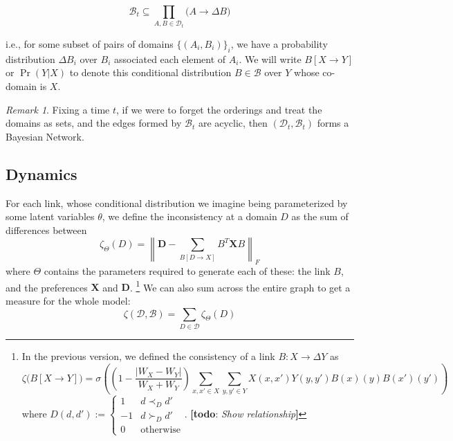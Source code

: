 \documentclass{article}
\theoremstyle{plain}
\theoremstyle{definition}
\theoremstyle{remark}
\newtheorem*{remark}{Remark}
\newcommand{\todo}[1]{{\color{red}\large\textbf{[todo}: {\normalsize\itshape#1}\textbf{]}}}
\newcommand\mat[1]{\mathbf #1}
\begin{document}
	\[  \mathcal B_t \subseteq \prod_{A, B \in \mathcal D_t} \Big( A \to \Delta B \Big) \] 
	
	i.e., for some subset of pairs of domains $\{ (A_i, B_i) \}_i$, we have a probability distribution $\Delta B_i$ over $B_i$ associated each element of $A_i$. We will write $B [X \to Y]$ or $\Pr(Y | X)$ to denote this conditional distribution $B \in \mathcal B$ over $Y$ whose co-domain is $X$.
	
	
	\begin{remark}
		Fixing a time $t$, if we were to forget the orderings and treat the domains as sets, and the edges formed by $\mathcal B_t$ are acyclic, then $(\mathcal D_t, \mathcal B_t)$ forms a Bayesian Network.
	\end{remark}
 
 	
 	
 	\subsection{Dynamics}
	
	
	
	For each link, whose conditional distribution we imagine being parameterized by some latent variables $\theta$, we define the inconsistency at a domain $D$ as the sum of differences between 
	\[ \zeta_\Theta(D) = \left\lVert \mat D  - \sum_{B[D \to X]} B^T \mat X B \right\rVert_F \]
	where $\Theta$ contains the parameters required to generate each of these: the link $B$, and the preferences $\mat X$ and $\mat D$.
 	\footnote{In the previous version, we defined the consistency of a link $B : X \to \Delta Y$ as 
 	 	\[ \zeta\big(B[X \to Y]\big) =  \sigma \left( \left(1- \frac{|W_X - W_Y|}{W_X + W_Y}\right) \sum_{x,x' \in X}\sum_{y,y' \in Y} X(x,x') Y(y,y') B(x)(y) B(x')(y') \right) \]
 		where 
 	 	$ D(d, d') := \begin{cases}
 	 		1 & d \prec_D d' \\
 	 		-1 & d \succ_D d' \\
 	 		0 & \text{otherwise}
 	 	\end{cases} $.  \todo{Show relationship}}	
 	We can also sum across the entire graph to get a measure for the whole model:
 	\[ \zeta(\mathcal D, \mathcal B) = \sum_{D \in \mathcal D} \zeta_\Theta(D) \]
 	
\end{document}
